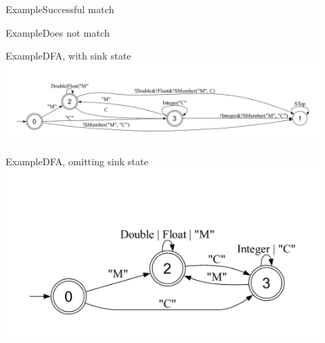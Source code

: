 \begin{frame}{Example}{Successful match}
  \usebox\exampleAbbox
\end{frame}

\begin{frame}{Example}{Does not match}
  \usebox\exampleAcbox
\end{frame}

\begin{frame}{Example}{DFA, with sink state}
  \includegraphics[width=0.9\textwidth]{example1.pdf}
\end{frame}


\begin{frame}{Example}{DFA, omitting sink state}
  \includegraphics[width=0.9\textwidth]{example2.pdf}
\end{frame}

